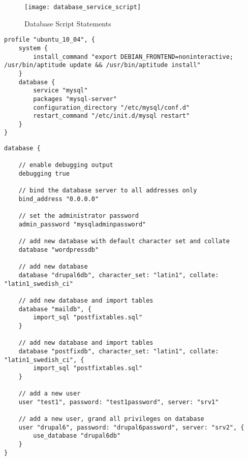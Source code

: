 \begin{sidewaysfigure}
\texttt{[image: database\_service\_script]}
\label{fig:database_script_statements}
\caption{Database Script Statements}
\end{sidewaysfigure}

\begin{lstlisting}[style=Java,label=lst:database_ubuntu_profile,caption=Database Example Ubuntu Profile]
profile "ubuntu_10_04", {
    system {
        install_command "export DEBIAN_FRONTEND=noninteractive; /usr/bin/aptitude update && /usr/bin/aptitude install"
    }
    database {
        service "mysql"
        packages "mysql-server"
        configuration_directory "/etc/mysql/conf.d"
        restart_command "/etc/init.d/mysql restart"
    }
}
\end{lstlisting}


\begin{lstlisting}[style=Java,label=lst:database_example_script,caption=Database Example Script]
database {

    // enable debugging output
    debugging true

    // bind the database server to all addresses only
    bind_address "0.0.0.0"

    // set the administrator password
    admin_password "mysqladminpassword"

    // add new database with default character set and collate
    database "wordpressdb"

    // add new database
    database "drupal6db", character_set: "latin1", collate: "latin1_swedish_ci"

    // add new database and import tables
    database "maildb", {
        import_sql "postfixtables.sql"
    }

    // add new database and import tables
    database "postfixdb", character_set: "latin1", collate: "latin1_swedish_ci", {
        import_sql "postfixtables.sql"
    }

    // add a new user
    user "test1", password: "test1password", server: "srv1"

    // add a new user, grand all privileges on database
    user "drupal6", password: "drupal6password", server: "srv2", {
        use_database "drupal6db"
    }
}
\end{lstlisting}

